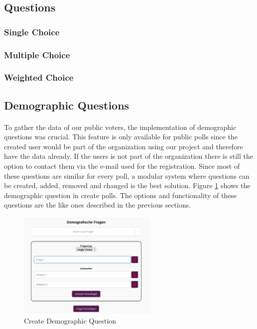 \documentclass[a4paper,12pt]{report}
\begin{document}
\subsection{Questions}
\subsubsection{Single Choice}
\subsubsection{Multiple Choice}
\subsubsection{Weighted Choice}
\subsection{Demographic Questions}
\paragraph{}
To gather the data of our public voters, the implementation of demographic questions was crucial. This feature is only available for public polls since the created user would be part of the organization using our project and therefore have the data already. If the users is not part of the organization there is still the option to contact them via the e-mail used for the registration. Since most of these questions are similar for every poll, a modular system where questions can be created, added, removed and changed is the best solution. Figure \ref{fig:create_dem_que} shows the demographic question in create polls. The options and functionality of these questions are the like ones described in the previous sections. 
\begin{figure}[h!]
	\centering
	\includegraphics[width=0.6\textwidth]{pics/demographic_question_create.jpg}
	\caption{Create Demographic Question}
	\label{fig:create_dem_que}
\end{figure}
\end{document}
